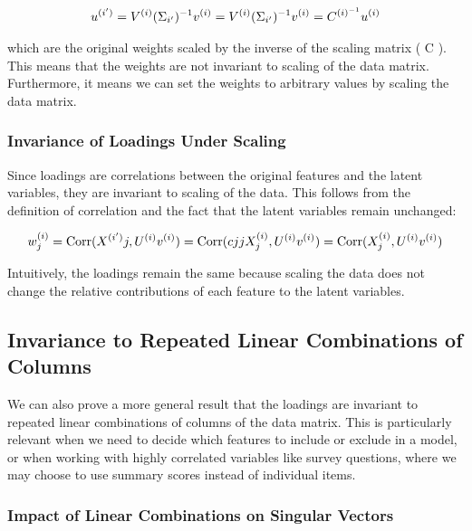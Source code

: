 \begin{align}
u^{(i')} = V^{(i)}(\Sigma_{i'})^{-1}v^{(i)} = V^{(i)}(\Sigma_{i'})^{-1}v^{(i)} = C^{{(i)}^{-1}}u^{(i)} \label{eq:weights_change2}
\end{align}

which are the original weights scaled by the inverse of the scaling matrix ( C ). This means that the weights are not invariant to scaling of the data matrix. Furthermore, it means we can set the weights to arbitrary values by scaling the data matrix.

\subsubsection{Invariance of Loadings Under Scaling}

Since \gls{loadings} are correlations between the original features and the latent variables, they are invariant to scaling of the data. This follows from the definition of correlation and the fact that the latent variables remain unchanged:

\begin{align}
w^{(i)}_j = \operatorname{Corr}(X^{(i')}j, U^{(i)}v^{(i)}) = \operatorname{Corr}(c{jj}X^{(i)}_j, U^{(i)}v^{(i)}) = \operatorname{Corr}(X^{(i)}_j, U^{(i)}v^{(i)}) \label{eq:loading_invariant}
\end{align}

Intuitively, the \gls{loadings} remain the same because scaling the data does not change the relative contributions of each feature to the latent variables.

\subsection{Invariance to Repeated Linear Combinations of Columns}\label{subsubsec:invariance-to-linear-combinations}

We can also prove a more general result that the \gls{loadings} are invariant to repeated linear combinations of columns of the data matrix. This is particularly relevant when we need to decide which features to include or exclude in a model, or when working with highly correlated variables like survey questions, where we may choose to use summary scores instead of individual items.

\subsubsection{Impact of Linear Combinations on Singular Vectors}

